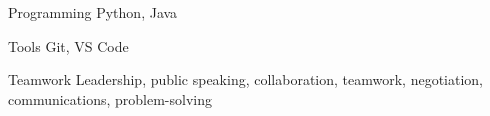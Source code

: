 
\begin{cvskills}
  \cvskill
    {Programming}
    {Python, Java}

  \cvskill
    {Tools}
    {Git, VS Code}

  \cvskill
    {Teamwork}
    {Leadership, public speaking, collaboration, teamwork, negotiation, communications, problem-solving}
\end{cvskills}